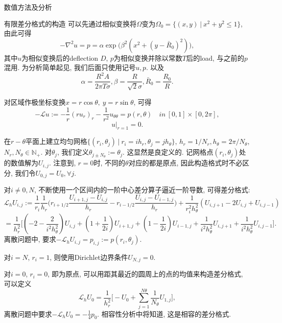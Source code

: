 \documentclass{article}
\begin{document}
\begin{section}{数值方法及分析}
    \begin{subsection}{有限差分格式的构造}
        可以先通过相似变换将$\Omega$变为$\Omega_0=\{(x,y)\ |\ x^2+y^2\leq 1\}$, 由此可得
        $$-\nabla^2 u = p=\alpha \exp\bigg(\beta^2(x^2+(y-\bar{R}_0)^2)\bigg),$$
        其中$u$为相似变换后的deflection $D$, $p$为相似变换并除以常数$T$后的load, 与之前的$p$混用. 为分析简单起见, 我们后面只使用记号$u,p$. 以及
        $$\alpha=\frac{R^2A}{2\pi T\sigma},\beta=\frac{R}{\sqrt{2}\sigma},\bar{R}_0=\frac{R_0}{R}.$$
        
        对区域作极坐标变换$x=r\cos\theta,\ y=r\sin\theta$, 可得
        $$-\mathcal{L} u:=-\frac{1}{r}(ru_r)_r -\frac{1}{r^2}u_{\theta\theta} = p(r,\theta)\quad in\ [0,1]\times[0,2\pi], $$
        $$u|_{r=1}=0.$$

        在$r-\theta$平面上建立均匀网格$\{(r_i,\theta_j)\ |\ r_i=ih_r,\theta_j=jh_\theta\}$, $h_r=1/N_r,h_\theta=2\pi/N_\theta$, $N_r,N_\theta\in\mathbb{N}_+$. 
        对$\theta_j$, 我们定义$\theta_{j\pm N_\theta}:=\theta_j$. 这显然是良定义的. 记网格点$(r_i,\theta_j)$处的数值解为$U_{i,j}$. 注意到, $r=0$时, 不同的$\theta$对应的都是原点, 
        因此构造格式时不必区分, 我们令$U_{0,j}=U_0,\forall j$.

        对$i\neq 0,N$, 不断使用一个区间内的一阶中心差分算子逼近一阶导数, 可得差分格式:
        $$\mathcal{L}_h U_{i,j}:=\frac{1}{r_i}\frac{1}{h_r}\bigg(r_{i+1/2}\frac{U_{i+1,j}-U_{i,j}}{h_r}-r_{i-1/2}\frac{U_{i,j}-U_{i-1,j}}{h_r}\bigg) + \frac{1}{r_i^2 h_\theta^2}(U_{i,j+1} - 2U_{i,j} + U_{i,j-1})$$ 
        $$=\frac{1}{h_r^2}\bigg[(-2-\frac{2}{i^2h_\theta^2})U_{i,j} + (1+\frac{1}{2i})U_{i+1,j} + (1-\frac{1}{2i})U_{i-1,j} + \frac{1}{i^2h_\theta^2}U_{i,j+1} + \frac{1}{i^2h_\theta^2}U_{i,j-1}\bigg].$$
        离散问题中, 要求$-\mathcal{L}_h U_{i,j} = p_{i,j}:=p(r_i,\theta_j)$.

        对$i=N$, $r_i=1$, 则使用Dirichlet边界条件$U_{N,j}=0$.

        对$i=0$, $r_i=0$, 即为原点, 可以用距其最近的圆周上的点的均值来构造差分格式, 可以定义
        $$\mathcal{L}_h U_0 = \frac{1}{h_r^2}\bigg[ -U_0+\sum_{j=1}^{N\theta}\frac{1}{N_\theta}U_{1,j}\bigg],$$
        离散问题中要求$-\mathcal{L}_hU_0 = -\frac{1}{4}p_0.$ 相容性分析中将知道, 这是相容的差分格式.


\end{subsection}
\end{section}
\end{document}
